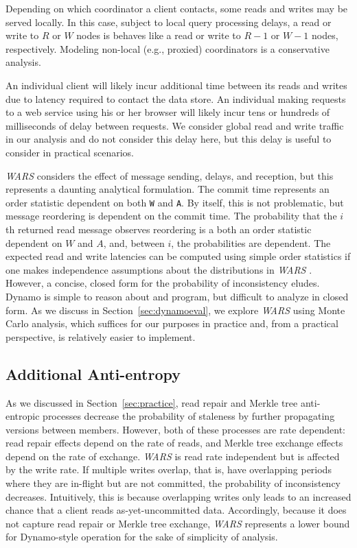 \documentclass{vldb}
\begin{document}
Depending on which coordinator a client contacts, some reads and
writes may be served locally.  In this case, subject to local query
processing delays, a read or write to $R$ or $W$ nodes is behaves like
a read or write to $R-1$ or $W-1$ nodes, respectively.  Modeling
non-local (e.g., proxied) coordinators is a conservative analysis.

An individual client will likely incur additional time between its
reads and writes due to latency required to contact the data store.
An individual making requests to a web service using his or her
browser will likely incur tens or hundreds of milliseconds of delay
between requests.  We consider global read and write traffic in our
analysis and do not consider this delay here, but this delay is useful
to consider in practical scenarios.

\textit{WARS}  considers the effect of message sending, delays, and reception,
but this represents a daunting analytical formulation.  The commit
time represents an order statistic dependent on both \texttt{W} and
\texttt{A}.  By itself, this is not problematic, but message
reordering is dependent on the commit time.  The probability that the
$i$th returned read message observes reordering is a both an order
statistic dependent on $W$ and $A$, and, between $i$, the
probabilities are dependent.  The expected read and write latencies can
be computed using simple order statistics if one makes independence
assumptions about the distributions in \textit{WARS} .  However, a concise,
closed form for the probability of inconsistency eludes.  Dynamo is
simple to reason about and program, but difficult to analyze in closed
form.  As we discuss in Section~\ref{sec:dynamoeval}, we explore \textit{WARS}  using
Monte Carlo analysis, which suffices for our purposes in practice and,
from a practical perspective, is relatively easier to implement.

\subsection{Additional Anti-entropy}

As we discussed in Section~\ref{sec:practice}, read repair and Merkle
tree anti-entropic processes decrease the probability of staleness by
further propagating versions between members.  However, both of these
processes are rate dependent: read repair effects depend on the rate
of reads, and Merkle tree exchange effects depend on the rate of
exchange.  \textit{WARS} is read rate independent but is affected by
the write rate.  If multiple writes overlap, that is, have overlapping
periods where they are in-flight but are not committed, the
probability of inconsistency decreases.  Intuitively, this is because
overlapping writes only leads to an increased chance that a client
reads as-yet-uncommitted data.  Accordingly, because it does not
capture read repair or Merkle tree exchange, \textit{WARS} represents
a lower bound for Dynamo-style operation for the sake of simplicity of
analysis.
\end{document}
